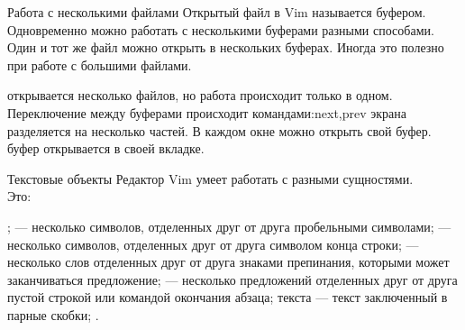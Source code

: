 \documentclass{beamer}
\begin{document}
\begin{frame}{Работа с несколькими файлами}
	Открытый файл в Vim называется буфером. Одновременно можно работать с несколькими буферами разными способами.\\
	Один и тот же файл можно открыть в нескольких буферах. Иногда это полезно при работе с большими файлами.
	\begin{itemize}
		 открывается несколько файлов, но работа происходит только в одном. Переключение между буферами происходит командами:next,prev
		 экрана разделяется на несколько частей. В каждом окне можно открыть свой буфер.
		 буфер открывается в своей вкладке.
	\end{itemize}
\end{frame}

\begin{frame}{Текстовые объекты}\label{objects}
	Редактор Vim умеет работать с разными сущностями. \\
	Это:
	\begin{itemize}
		\itemСимвол;
		 --- несколько символов, отделенных друг от друга пробельными символами;
		 --- несколько символов, отделенных друг от друга символом конца строки;
		 --- несколько слов отделенных друг от друга знаками препинания, которыми может заканчиваться предложение;
		 --- несколько предложений отделенных друг от друга пустой строкой или командой окончания абзаца;
		 текста --- текст заключенный в парные скобки;
		\itemФайл.
	\end{itemize}
\end{frame}
\end{document}
